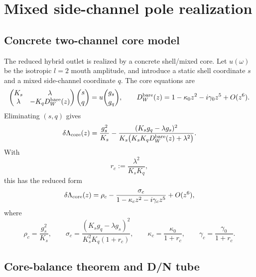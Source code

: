 \section{Mixed side-channel pole realization}
\label{sec:app-part04_geometry_retarded_mouth:mixed-side-channel-pole-realization}

\subsection{Concrete two-channel core model}
\label{subsec:app-part04-two-channel-core}

The reduced hybrid outlet is realized by a concrete shell/mixed core.  Let \(u(\omega)\) be the isotropic \(l=2\) mouth amplitude, and introduce a static shell coordinate \(s\) and a mixed side-channel coordinate \(q\).  The core equations are
\begin{equation}
\label{eq:app-part04-core-matrix}
\begin{pmatrix}
K_s & \lambda\\
\lambda & -K_qD_W^{\rm bare}(z)
\end{pmatrix}
\binom{s}{q}
=
u
\binom{g_s}{g_q},
\qquad
D_W^{\rm bare}(z)=1-\kappa_0z^2-i\gamma_0z^5+O(z^6).
\end{equation}
Eliminating \((s,q)\) gives
\begin{equation}
\label{eq:app-part04-core-schur}
\delta\Lambda_{\rm core}(z)
=
\frac{g_s^2}{K_s}
-
\frac{(K_sg_q-\lambda g_s)^2}{K_s\bigl(K_sK_qD_W^{\rm bare}(z)+\lambda^2\bigr)}.
\end{equation}
With
\begin{equation}
\label{eq:app-part04-rc-def}
r_c:=\frac{\lambda^2}{K_sK_q},
\end{equation}
this has the reduced form
\begin{equation}
\label{eq:app-part04-core-reduced-rho-sigma}
\delta\Lambda_{\rm core}(z)
=
\rho_c-\frac{\sigma_c}{1-\kappa_cz^2-i\gamma_cz^5}+O(z^6),
\end{equation}
where
\begin{equation}
\label{eq:app-part04-core-identifications}
\rho_c=\frac{g_s^2}{K_s},
\qquad
\sigma_c=\frac{(K_sg_q-\lambda g_s)^2}{K_s^2K_q(1+r_c)},
\qquad
\kappa_c=\frac{\kappa_0}{1+r_c},
\qquad
\gamma_c=\frac{\gamma_0}{1+r_c}.
\end{equation}

\subsection{Core-balance theorem and D/N tube}
\label{subsec:app-part04-core-balance}

